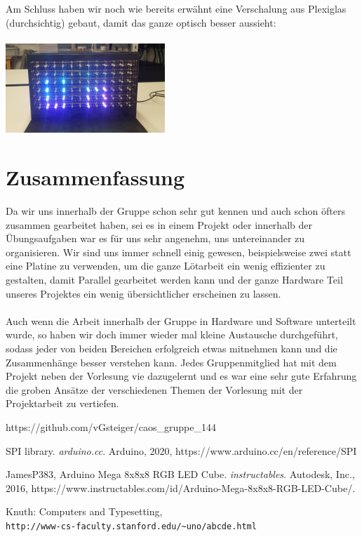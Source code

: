 \documentclass[12pt,a4paper]{article}
\begin{document}
Am Schluss haben wir noch wie bereits erwähnt eine Verschalung aus Plexiglas (durchsichtig) gebaut, 
damit das ganze optisch besser aussieht: \\\\
\includegraphics[width=0.45\textwidth]{Endprod2.jpg}


\section{Zusammenfassung}

Da wir uns innerhalb der Gruppe schon sehr gut kennen und auch schon öfters zusammen gearbeitet haben, sei es in einem Projekt oder 
innerhalb der Übungsaufgaben war es für uns sehr angenehm, uns untereinander zu organisieren. Wir sind uns immer schnell einig gewesen,
beispielsweise zwei statt eine Platine zu verwenden, um die ganze Lötarbeit ein wenig effizienter zu gestalten, damit Parallel gearbeitet werden kann und
der ganze Hardware Teil unseres Projektes ein wenig übersichtlicher erscheinen zu lassen. \\\\
Auch wenn die Arbeit innerhalb der Gruppe in Hardware und Software unterteilt wurde, so haben wir doch immer wieder 
mal kleine Austausche durchgeführt, sodass jeder von beiden Bereichen erfolgreich etwas mitnehmen kann und die Zusammenhänge 
besser verstehen kann.
Jedes Gruppenmitglied hat mit dem Projekt neben der Vorlesung vie dazugelernt und es war eine sehr gute Erfahrung die groben Ansätze
der verschiedenen Themen der Vorlesung mit der Projektarbeit zu vertiefen.


\newpage

    \item https://github.com/vGsteiger/caos\_gruppe\_144
\begin{thebibliography}{9}
	SPI library.
	\textit{arduino.cc}.
	Arduino, 2020, https://www.arduino.cc/en/reference/SPI
	
	JamesP383, Arduino Mega 8x8x8 RGB LED Cube. 
	\textit{instructables}. 
	Autodesk, Inc., 2016, https://www.instructables.com/id/Arduino-Mega-8x8x8-RGB-LED-Cube/.


	
	Knuth: Computers and Typesetting,
	\\\texttt{http://www-cs-faculty.stanford.edu/\~{}uno/abcde.html}
\end{thebibliography}
\end{document}
